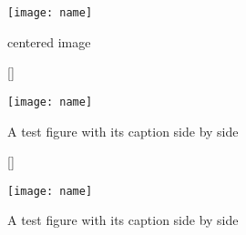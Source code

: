 \documentclass{article}
\begin{document}
\begin{figure}
    \texttt{[image: name]}
    \caption{centered image}
\end{figure}

\begin{figure}
\flushleft
{}[\FBwidth]
{\caption{A test figure with its caption side by side}\label{fig:test}}
{\texttt{[image: name]}}
\end{figure}

\begin{figure}
[\FBwidth]
{\caption{A test figure with its caption side by side}\label{fig:test}}
{\texttt{[image: name]}}
\end{figure}
\end{document}
